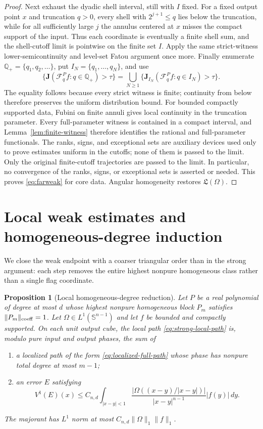 \documentclass[11pt]{article}
\numberwithin{equation}{section}
\newtheorem{proposition}[theorem]{Proposition}
\theoremstyle{remark}
\theoremstyle{definition}
\newcommand{\Sph}{\mathbb S}
\newcommand{\cF}{\mathcal F}
\newcommand{\norm}[1]{\lVert #1\rVert}
\begin{document}
\begin{proof}
Next exhaust the dyadic shell interval, still with \(I\) fixed.  For a
fixed output point $x$ and truncation $q>0$, every shell with
$2^{j+1}\le q$ lies below the
truncation, while for all sufficiently large $j$ the annulus centered at
$x$ misses the compact support of the input.  Thus each coordinate is
eventually a finite shell sum, and the shell-cutoff limit is pointwise on
the finite set \(I\).  Apply the same strict-witness lower-semicontinuity
and level-set Fatou argument once more.  Finally enumerate
\(\mathbb Q_+=\{q_1,q_2,\ldots\}\), put
\(I_N=\{q_1,\ldots,q_N\}\), and use
\[
 \{\mathbf J(\cF^P_qf:q\in\mathbb Q_+)>\tau\}
 =\bigcup_{N\ge1}\{\mathbf J_{I_N}(\cF^P_qf:q\in I_N)>\tau\}.
\]
The equality follows because every strict witness is finite; continuity
from below therefore preserves the uniform distribution bound.
For bounded compactly supported data, Fubini on finite annuli gives local
continuity in the truncation parameter.  Every full-parameter witness is
contained in a compact interval, and Lemma~\ref{lem:finite-witness}
therefore identifies the rational and full-parameter functionals.  The
ranks, signs, and
exceptional sets are auxiliary devices used only to prove estimates
uniform in the cutoffs; none of them is passed to the limit.  Only the
original finite-cutoff trajectories are passed to the limit.  In
particular, no convergence of the ranks, signs, or exceptional sets is
asserted or needed.  This proves \eqref{eq:farweak} for core data.
Angular homogeneity restores $\mathfrak L(\Omega)$.
\end{proof}

\section{Local weak estimates and homogeneous-degree induction}
\label{sec:weak-local}

We close the weak endpoint with a coarser triangular order than in the
strong argument: each step removes the entire highest nonpure homogeneous
class rather than a single flag coordinate.

\begin{proposition}[Local homogeneous-degree reduction]
\label{prop:degree-local-reduction}
Let $P$ be a real polynomial of degree at most $d$ whose highest nonpure
homogeneous block $P_m$ satisfies $\norm{P_m}_{\rm coeff}=1$.  Let
$\Omega\in L^1(\Sph^{n-1})$ and let $f$ be bounded and compactly
supported.  On each unit output cube, the local path
\eqref{eq:strong-local-path} is, modulo pure input and output phases, the
sum of
\begin{enumerate}[label=\textup{(\roman*)}]
\item a localized path of the form \eqref{eq:localized-full-path} whose
phase has nonpure total degree at most $m-1$;
\item an error $E$ satisfying
\begin{equation}\label{eq:degree-local-error}
 V^1(E)(x)\le C_{n,d}
 \int_{|x-y|<1}\frac{|\Omega((x-y)/|x-y|)|}{|x-y|^{n-1}}|f(y)|\,dy.
\end{equation}
\end{enumerate}
The majorant has $L^1$ norm at most
$C_{n,d}\norm\Omega_1\norm f_1$.
\end{proposition}
\end{document}
